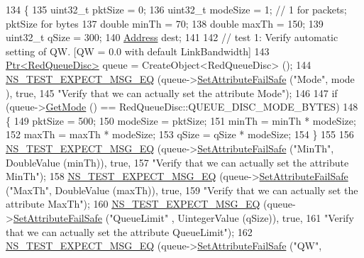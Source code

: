 \begin{DoxyCode}
134 \{
135   uint32\_t pktSize = 0;
136   uint32\_t modeSize = 1;  \textcolor{comment}{// 1 for packets; pktSize for bytes}
137   \textcolor{keywordtype}{double} minTh = 70;
138   \textcolor{keywordtype}{double} maxTh = 150;
139   uint32\_t qSize = 300;
140   \hyperlink{classns3_1_1Address}{Address} dest;
141 
142   \textcolor{comment}{// test 1: Verify automatic setting of QW. [QW = 0.0 with default LinkBandwidth]}
143   \hyperlink{classns3_1_1Ptr}{Ptr<RedQueueDisc>} queue = CreateObject<RedQueueDisc> ();
144   \hyperlink{group__testing_ga7304ba46a28d8cf08dfdfd6499cf7068}{NS\_TEST\_EXPECT\_MSG\_EQ} (queue->\hyperlink{classns3_1_1ObjectBase_aa7d333004e970f925a4ed5df275541b5}{SetAttributeFailSafe} (\textcolor{stringliteral}{"Mode"}, mode
      ), \textcolor{keyword}{true},
145                          \textcolor{stringliteral}{"Verify that we can actually set the attribute Mode"});
146 
147   \textcolor{keywordflow}{if} (queue->\hyperlink{classns3_1_1RedQueueDisc_af1064caa1eee00041ebfb43bc6e25abc}{GetMode} () == RedQueueDisc::QUEUE\_DISC\_MODE\_BYTES)
148     \{
149       pktSize = 500;
150       modeSize = pktSize;
151       minTh = minTh * modeSize;
152       maxTh = maxTh * modeSize;
153       qSize = qSize * modeSize;
154     \}
155 
156   \hyperlink{group__testing_ga7304ba46a28d8cf08dfdfd6499cf7068}{NS\_TEST\_EXPECT\_MSG\_EQ} (queue->\hyperlink{classns3_1_1ObjectBase_aa7d333004e970f925a4ed5df275541b5}{SetAttributeFailSafe} (\textcolor{stringliteral}{"MinTh"}, 
      DoubleValue (minTh)), \textcolor{keyword}{true},
157                          \textcolor{stringliteral}{"Verify that we can actually set the attribute MinTh"});
158   \hyperlink{group__testing_ga7304ba46a28d8cf08dfdfd6499cf7068}{NS\_TEST\_EXPECT\_MSG\_EQ} (queue->\hyperlink{classns3_1_1ObjectBase_aa7d333004e970f925a4ed5df275541b5}{SetAttributeFailSafe} (\textcolor{stringliteral}{"MaxTh"}, 
      DoubleValue (maxTh)), \textcolor{keyword}{true},
159                          \textcolor{stringliteral}{"Verify that we can actually set the attribute MaxTh"});
160   \hyperlink{group__testing_ga7304ba46a28d8cf08dfdfd6499cf7068}{NS\_TEST\_EXPECT\_MSG\_EQ} (queue->\hyperlink{classns3_1_1ObjectBase_aa7d333004e970f925a4ed5df275541b5}{SetAttributeFailSafe} (\textcolor{stringliteral}{"QueueLimit"}
      , UintegerValue (qSize)), \textcolor{keyword}{true},
161                          \textcolor{stringliteral}{"Verify that we can actually set the attribute QueueLimit"});
162   \hyperlink{group__testing_ga7304ba46a28d8cf08dfdfd6499cf7068}{NS\_TEST\_EXPECT\_MSG\_EQ} (queue->\hyperlink{classns3_1_1ObjectBase_aa7d333004e970f925a4ed5df275541b5}{SetAttributeFailSafe} (\textcolor{stringliteral}{"QW"}, 

\end{DoxyCode}
